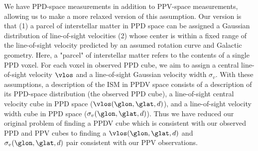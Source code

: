 We have PPD-space measurements in addition to PPV-space measurements, allowing us to make a more relaxed version of this assumption. 
Our version is that (1) a parcel of interstellar matter in PPD space can be assigned a Gaussian distribution of line-of-sight velocities (2) whose center is within a fixed range of the line-of-sight velocity predicted by an assumed rotation curve and Galactic geometry. 
Here, a "parcel" of interstellar matter refers to the contents of a single PPD voxel. 
For each voxel in observed PPD cube, we aim to assign a central line-of-sight velocity $\vlos$ and a line-of-sight Gaussian velocity width $\sigma_v$. 
With these assumptions, a description of the ISM in PPDV space consists of a description of its PPD-space distribution (the observed PPD cube), a line-of-sight central velocity cube in PPD space ($\vlos(\glon, \glat, d)$), and a line-of-sight velocity width cube in PPD space ($\sigma_v (\glon, \glat, d)$). 
Thus we have reduced our original problem of finding a PPDV cube which is consistent with our observed PPD and PPV cubes to finding a $\vlos(\glon, \glat, d)$ and $\sigma_v(\glon, \glat, d)$ pair consistent with our PPV observations.




